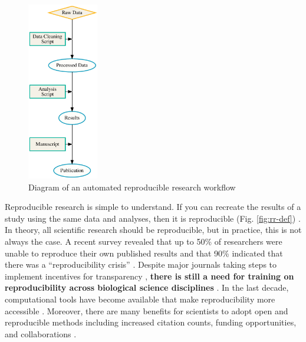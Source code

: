\documentclass[12pt,letterpaper]{article}
\begin{document}
\begin{figure} %
  \includegraphics[width=0.275\textwidth]{figure/rr.pdf}
  \caption{Diagram of an automated reproducible research workflow}
  \label{fig:rr}
\end{figure}

Reproducible research is simple to understand. 
If you can recreate the results of a study using the same data and analyses, then it is reproducible (Fig. \ref{fig:rr-def}) \citep{buckheit1995wavelab,peng2011reproducible,patil2016statistical}. 
In theory, all scientific research should be reproducible, but in practice, this is not always the case.
A recent survey revealed that up to 50\% of researchers were unable to reproduce their own published results and that 90\% indicated that there was a ``reproducibility crisis'' \citep{baker2016scientists}.
Despite major journals taking steps to implement incentives for transparency \citep{nature2017announcement}, \textbf{there is still a need for training on reproducibility across biological science disciplines} \citep{barone2017unmet}.
In the last decade, computational tools have become available that make reproducibility more accessible \citep{boettiger2015introduction,wilson2016good}.
Moreover, there are many benefits for scientists to adopt open and reproducible methods including increased citation counts, funding opportunities, and collaborations \citep{mckiernan2016open,stewart-lowndes2017path,schmidt2016stepping}.
\end{document}

